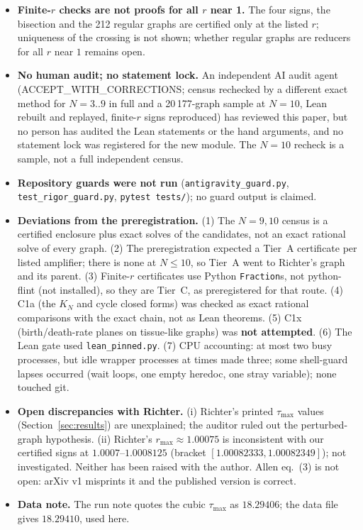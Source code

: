 \documentclass[10pt]{article}
\begin{document}
\begin{itemize}
\item \textbf{Finite-$r$ checks are not proofs for all $r$ near 1.} The four signs, the bisection and the 212 regular graphs are certified only at the listed $r$; uniqueness of the crossing is not shown; whether regular graphs are reducers for all $r$ near $1$ remains open.
\item \textbf{No human audit; no statement lock.} An independent AI audit agent (ACCEPT\_WITH\_CORRECTIONS; census rechecked by a different exact method for $N=3..9$ in full and a 20\,177-graph sample at $N=10$, Lean rebuilt and replayed, finite-$r$ signs reproduced) has reviewed this paper, but no person has audited the Lean statements or the hand arguments, and no statement lock was registered for the new module. The $N=10$ recheck is a sample, not a full independent census.
\item \textbf{Repository guards were not run} (\texttt{antigravity\_guard.py}, \texttt{test\_rigor\_guard.py}, \texttt{pytest tests/}); no guard output is claimed.
\item \textbf{Deviations from the preregistration.} (1) The $N=9,10$ census is a certified enclosure plus exact solves of the candidates, not an exact rational solve of every graph. (2) The preregistration expected a Tier~A certificate per listed amplifier; there is none at $N\le10$, so Tier~A went to Richter's graph and its parent. (3) Finite-$r$ certificates use Python \texttt{Fraction}s, not python-flint (not installed), so they are Tier~C, as preregistered for that route. (4) C1a (the $K_N$ and cycle closed forms) was checked as exact rational comparisons with the exact chain, not as Lean theorems. (5) C1x (birth/death-rate planes on tissue-like graphs) was \textbf{not attempted}. (6) The Lean gate used \texttt{lean\_pinned.py}. (7) CPU accounting: at most two busy processes, but idle wrapper processes at times made three; some shell-guard lapses occurred (wait loops, one empty heredoc, one stray variable); none touched git.
\item \textbf{Open discrepancies with Richter.} (i) Richter's printed $\tau_{\max}$ values (Section~\ref{sec:results}) are unexplained; the auditor ruled out the perturbed-graph hypothesis. (ii) Richter's $r_{\max}\approx1.00075$ is inconsistent with our certified signs at $1.0007$--$1.0008125$ (bracket $[1.00082333,1.00082349]$); not investigated. Neither has been raised with the author. Allen eq.~(3) is not open: arXiv v1 misprints it and the published version is correct.
\item \textbf{Data note.} The run note quotes the cubic $\tau_{\max}$ as $18.29406$; the data file gives $18.29410$, used here.
\end{itemize}
\end{document}
